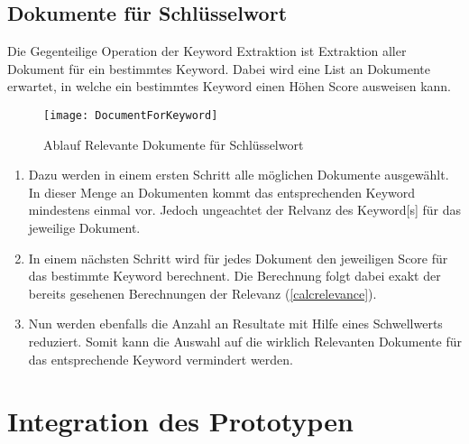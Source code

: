
\subsection{Dokumente für Schlüsselwort}


Die Gegenteilige Operation der \gls{Keyword} Extraktion ist Extraktion aller Dokument für ein bestimmtes \gls{Keyword}. Dabei wird eine List an Dokumente erwartet, in welche ein bestimmtes \gls{Keyword} einen Höhen Score ausweisen kann. 

    \begin{figure}[H]
    \centering
    \texttt{[image: DocumentForKeyword]}
    \caption{Ablauf Relevante Dokumente für Schlüsselwort}
    \label{fig:seqdocforkeyword}
    \end{figure}
\begin{enumerate}
    \item Dazu werden in einem ersten Schritt alle möglichen Dokumente ausgewählt. In dieser Menge an Dokumenten kommt das entsprechenden \gls{Keyword} mindestens einmal vor. Jedoch ungeachtet der Relvanz des \gls{Keyword}[s] für das jeweilige Dokument.
    \item In einem nächsten Schritt wird für jedes Dokument den jeweiligen Score für das bestimmte \gls{Keyword} berechnent. Die Berechnung folgt dabei exakt der bereits gesehenen Berechnungen der Relevanz (\autoref{calcrelevance}).

    \item Nun werden ebenfalls die Anzahl an Resultate mit Hilfe eines Schwellwerts reduziert. Somit kann die Auswahl auf die wirklich Relevanten Dokumente für das entsprechende \gls{Keyword} vermindert werden.
            
\end{enumerate}








\section{Integration des Prototypen}


